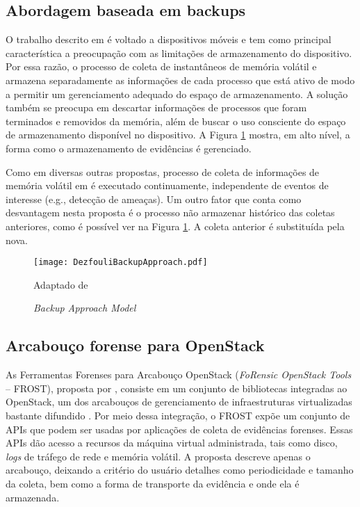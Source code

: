 \subsection{Abordagem baseada em backups}
\label{sec:modelobackup}

O trabalho descrito em \cite{DezfouliBackupApproach:2012} é voltado a dispositivos móveis e tem como principal característica a preocupação com as limitações de armazenamento do dispositivo.
%
Por essa razão, o processo de coleta de instantâneos de memória volátil e armazena separadamente as informações de cada processo que está ativo de modo a permitir um gerenciamento adequado do espaço de armazenamento. 
%
A solução também se preocupa em descartar informações de processos que foram terminados e removidos da memória, além de buscar o uso consciente do espaço de armazenamento disponível no dispositivo.
%
A Figura \ref{fig:DezfouliBackupApproach} mostra, em alto nível, a forma como o armazenamento de evidências é gerenciado.

Como em diversas outras propostas, processo de coleta de informações de memória volátil em \cite{DezfouliBackupApproach:2012} é executado continuamente, independente de eventos de interesse (e.g., detecção de ameaças). 
%
Um outro fator que conta como desvantagem nesta proposta é o processo não armazenar histórico das coletas anteriores, como é possível ver na Figura \ref{fig:DezfouliBackupApproach}. A coleta anterior é substituída pela nova.
%


\begin{figure}[htb!]
\footnotesize
\caption{\textit{Backup Approach Model}}
\texttt{[image: DezfouliBackupApproach.pdf]}
\centering
\label{fig:DezfouliBackupApproach}
\begin{center}
Adaptado de \cite{DezfouliBackupApproach:2012} 
\end{center}
\end{figure}


\subsection{Arcabouço forense para OpenStack}
\label{sec:frost}

As Ferramentas Forenses para Arcabouço OpenStack (\textit{FoRensic OpenStack Tools} -- FROST), proposta por \cite{DykstraFROST:2013}, consiste em um conjunto de bibliotecas integradas ao OpenStack, um dos arcabouços de gerenciamento de infraestruturas virtualizadas bastante difundido \cite{StackFramework:2018}.
%
Por meio dessa integração, o FROST expõe um conjunto de APIs que podem ser usadas por aplicações de coleta de evidências forenses.
%
Essas APIs dão acesso a recursos da máquina virtual administrada, tais como disco, \textit{logs} de tráfego de rede e memória volátil.
%
A proposta descreve apenas o arcabouço, deixando a critério do usuário detalhes como periodicidade e tamanho da coleta, bem como a forma de transporte da evidência e onde ela é armazenada.


